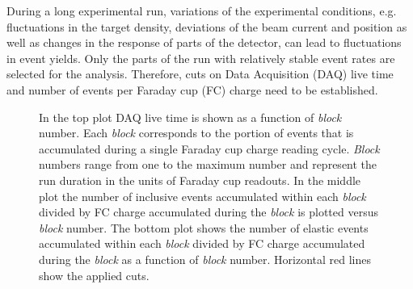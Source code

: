During a long experimental run, variations of the experimental conditions, e.g. fluctuations in the target density, deviations of the beam current and position as well as changes in the response of parts of the detector, can lead to fluctuations in event yields. Only the parts of the run with relatively stable event rates are selected for the analysis.
Therefore, cuts on Data Acquisition (DAQ) live time and number of events per Faraday cup (FC) charge need to be established.

\afterpage{\clearpage}
\begin{figure}[htp]
\begin{center}
\caption{\small In the top plot DAQ live time is shown as a function of {\em block} number. Each {\em block} corresponds to  the portion of events that is accumulated during a single Faraday cup charge reading cycle. {\em Block} numbers range from one to the maximum number and represent the run duration in the units of Faraday cup readouts. In the middle plot the number of inclusive events accumulated within each {\em block} divided by FC charge accumulated during the {\em block} is  plotted versus {\em block} number. The bottom plot shows the number of elastic events accumulated within each {\em block} divided by FC charge accumulated during the {\em block} as a function of {\em block} number. Horizontal red lines show the applied cuts.  \label{fig:qual_check_2d}}
\end{center}
\end{figure}\vspace{-0.75em}

